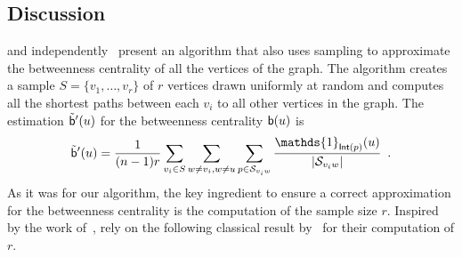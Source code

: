 \subsection{Discussion}\label{sec:discussion}
\citet{JacobKLPT05} and independently~\citet{BrandesP07} present an algorithm
that also uses sampling to approximate the betweenness centrality of all the
vertices of the graph. The algorithm creates a sample $S=\{v_1,\dotsc,v_r\}$ of
$r$ vertices drawn uniformly at random and computes all the shortest paths
between each $v_i$ to all other vertices in the graph. The estimation
$\tilde{\mathsf{b}}'(u)$ for the betweenness centrality $\mathsf{b}(u)$ is
\[ 
\tilde\betw'(u)= \frac{1}{(n-1)r}\sum_{v_i\in S}\sum_{w\neq v_i,w\neq
u}\sum_{p\in\mathcal{S}_{v_iw}}\frac{\mathds{1}_{\mathsf{Int}(p)}(u)}{|\mathcal{S}_{v_iw}|}\enspace.
\]
As it was for our algorithm, the key ingredient to ensure a correct
approximation for the betweenness centrality is the computation of the sample
size $r$. Inspired by the work of~\citet{EppsteinW04}, \citet{BrandesP07} rely
on the following classical result by~\citet{Hoeffding63} for their computation
of $r$.
%
